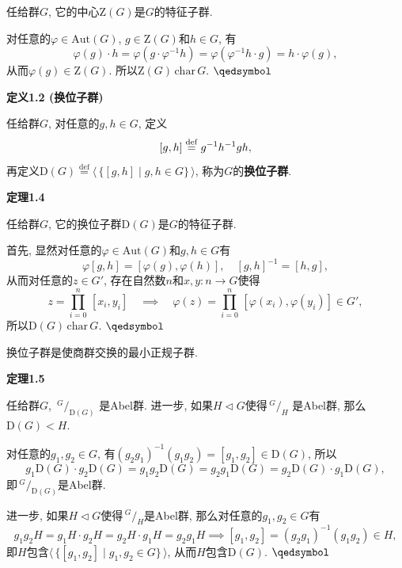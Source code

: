 \documentclass[UTF8]{ctexart}
\begin{document}
任给群$G$, 它的中心$\mathrm{Z}(G)$是$G$的特征子群.


对任意的$\varphi\in\mathrm{Aut}(G)$, $g\in\mathrm{Z}(G)$和$h\in G$, 有
\[
    \varphi(g)\cdot h=\varphi(g\cdot\varphi^{-1}h)=
    \varphi(\varphi^{-1}h\cdot g)=h\cdot\varphi(g),
\]
从而$\varphi(g)\in\mathrm{Z}(G)$. 所以$\mathrm{Z}(G)\,\mathrm{char}\,G$.
\hfill $\qedsymbol$





\newpage

\hypertarget{sec:定义1.2}{}
\noindent\textbf{定义1.2 (换位子群)}

任给群$G$, 对任意的$g,h\in G$, 定义
\vspace{-3pt}
\[
    [g,h]\overset{\mathrm{def}}{=}g^{-1}h^{-1}gh,\\[-3pt]
\]
再定义$\mathrm{D}(G)\overset{\mathrm{def}}{=}
\langle\,\{[g,h]\mid g,h\in G\}\,\rangle$, 称为$G$的\textbf{换位子群}.

\vspace{10pt}

\hypertarget{sec:定理1.4}{}
\noindent\textbf{定理1.4}

任给群$G$, 它的换位子群$\mathrm{D}(G)$是$G$的特征子群.


首先, 显然对任意的$\varphi\in\mathrm{Aut}(G)$和$g,h\in G$有
\[
    \varphi[g,h]=[\varphi(g),\varphi(h)],\quad[g,h]^{-1}=[h,g],
\]
从而对任意的$z\in G'$, 存在自然数$n$和$x,y:n\to G$使得
\vspace{3pt}
\[
    z=\prod_{i=0}^n\,[x_i,y_i]\quad\implies\quad
    \varphi(z)=\prod_{i=0}^n\,[\varphi(x_i),\varphi(y_i)]\in G',
\]
所以$\mathrm{D}(G)\,\mathrm{char}\,G$. \hfill $\qedsymbol$

\vspace{10pt}

换位子群是使商群交换的最小正规子群.

\vspace{10pt}

\hypertarget{sec:定理1.5}{}
\noindent\textbf{定理1.5}

任给群$G$, $\,\!^{\displaystyle G}\!/_{\displaystyle\mathrm{D}(G)}$
是Abel群. 进一步, 如果$H\lhd G$使得$\,\!^{\displaystyle G}\!/_{\displaystyle H}$
是Abel群, 那么$\mathrm{D}(G)<H$.


对任意的$g_1,g_2\in G$, 有$(g_2g_1)^{-1}(g_1g_2)=[g_1,g_2]\in\mathrm{D}(G)$, 所以
\[
    g_1\mathrm{D}(G)\cdot g_2\mathrm{D}(G)=g_1g_2\mathrm{D}(G)=
    g_2g_1\mathrm{D}(G)=g_2\mathrm{D}(G)\cdot g_1\mathrm{D}(G),
\]
即$\,\!^{\displaystyle G}\!/_{\displaystyle\mathrm{D}(G)}$是Abel群.

\vspace{6pt}
进一步, 如果$H\lhd G$使得$\,\!^{\displaystyle G}\!/_{\displaystyle H}$是Abel群,
那么对任意的$g_1,g_2\in G$有
\[
    g_1g_2H=g_1H\cdot g_2H=g_2H\cdot g_1H=g_2g_1H\implies
    [g_1,g_2]=(g_2g_1)^{-1}(g_1g_2)\in H,
\]
即$H$包含$\langle\,\{[g_1,g_2]\mid g_1,g_2\in G\}\,\rangle$,
从而$H$包含$\mathrm{D}(G)$. \hfill $\qedsymbol$
\end{document}
